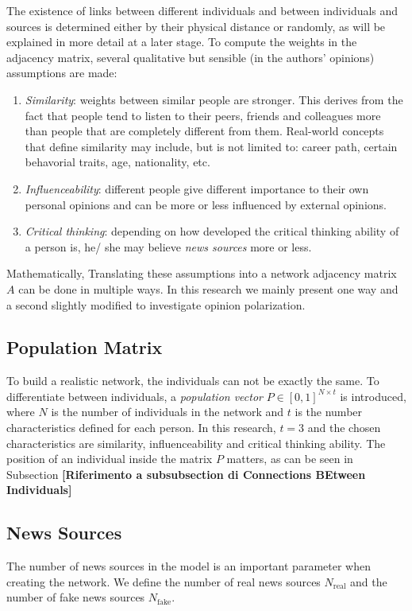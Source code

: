 The existence of links between different individuals and between individuals and sources is determined either by their physical distance or randomly, as will be explained in more detail at a later stage.
To compute the weights in the adjacency matrix, several qualitative but sensible (in the authors' opinions) assumptions are made:
\renewcommand{\theenumi}{\roman{enumi}}
\begin{enumerate}
\item \textit{Similarity}: weights between similar people are stronger. This derives from the fact that people tend to listen to their peers, friends and colleagues more than people that are completely different from them. Real-world concepts that define similarity may include, but is not limited to: career path, certain behavorial traits, age, nationality, etc.
\item \textit{Influenceability}: different people give different importance to their own personal opinions and can be more or less influenced by external opinions.
\item \textit{Critical thinking}: depending on how developed the critical thinking ability of a person is, he/ she may believe \textit{news sources} more or less.
\end{enumerate}
Mathematically, 
Translating these assumptions into a network adjacency matrix $A$ can be done in multiple ways. In this research we mainly present one way and a second slightly modified to investigate opinion polarization. 
\subsection{Population Matrix}
To build a realistic network, the individuals can not be exactly the same. To differentiate between individuals, a \textit{population vector} $P \in {[0,1]}^{N \times t}$ is introduced, where $N$ is the number of individuals in the network and $t$ is the number characteristics defined for each person. In this research, $t=3$ and the chosen characteristics are similarity, influenceability and critical thinking ability. The position of an individual inside the matrix $P$ matters, as can be seen in Subsection \textbf{[Riferimento a subsubsection di Connections BEtween Individuals]}
\subsection{News Sources}
The number of news sources in the model is an important parameter when creating the network. We define the number of real news sources $N_{\text{real}}$ and the number of fake news sources $N_{\text{fake}}$.
